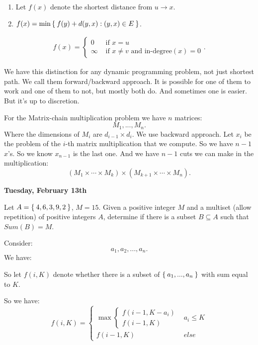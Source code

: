 \documentclass[reqno]{amsbook}
\theoremstyle{plain}
\numberwithin{section}{chapter}
\numberwithin{equation}{chapter}
\theoremstyle{definition}
\theoremstyle{remark}
\newcommand{\sub}{\subseteq}
\newcommand{\bee}{\begin{equation}\begin{aligned}}
\newcommand{\eee}{\end{aligned}\end{equation}}
\begin{document}
\begin{enumerate}
\item Let $f(x)$ denote the shortest distance from $u \to x$. 
\item $f(x) = \min\Set{f(y) + d(y,x):(y,x) \in E}$. 
\end{enumerate}

 \bee 
 f(x) = \begin{cases}
 0 & \text{ if } x = u\\
 \infty & \text{ if } x \neq v \text{ and in-degree}(x) = 0
 \end{cases}. 
 \eee 
 
 We have this distinction for any dynamic programming problem, not just shortest path. We call them forward/backward approach. It is possible for one of them to work and one of them to not, but mostly both do. And sometimes one is easier. But it's up to discretion. 
 
 
 
For the Matrix-chain multiplication problem we have $n$ matrices: 
$$
M_1,...,M_n.
$$
Where the dimensions of $M_i$ are $d_{i - 1} \times d_i$. We use backward approach. Let $x_i$ be the problem of the $i$-th matrix multiplication that we compute. So we have $n - 1$ $x$'s. So we know $x_{n - 1}$ is the last one. And we have $n - 1$ cuts we can make in the multiplication:
$$
(M_1 \times \cdots \times M_k) \times (M_{k + 1} \times \cdots \times M_n).
$$


\textbf{Tuesday, February 13th}

Let $A = \Set{4,6,3,9,2}$, $M = 15$. Given a positive integer $M$ and a multiset (allow repetition) of positive integers $A$, determine if there is a subset $B \sub A$ such that $Sum(B) = M$. 

Consider:
$$
a_1,a_2,...,a_n.
$$
We have:

\begin{center}
\end{center}

So let $f(i,K)$ denote whether there is a subset of $\Set{a_1,...,a_n}$ with sum equal to $K$. 

So we have: 
$$
f(i,K) = \begin{cases}
\max \begin{cases}
f(i - 1,K - a_i)\\
f(i - 1,K)
\end{cases} & a_i \leq K\\
f(i - 1,K) & else
\end{cases}
$$
\end{document}
